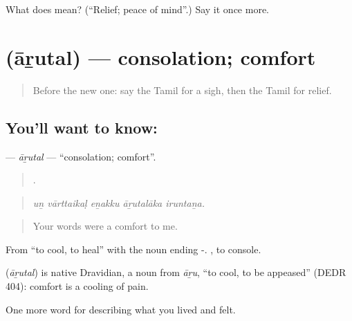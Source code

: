 \begin{tcolorbox}[breakable,colback=teal!4,colframe=teal!35!black,title={Before you move on}]
What does  mean? (\textquotedblleft{}Relief; peace of mind\textquotedblright{}.) Say it once more.
\end{tcolorbox}
\section[\texorpdfstring{\ta{ஆறுதல்} (āṟutal)}{ஆறுதல் (āṟutal)}]{ (āṟutal) — consolation; comfort}

\label{lesson:TA-C456-arutal}



\begin{quote}
Before the new one: say the Tamil for a sigh, then the Tamil for relief.
\end{quote}

\subsection*{You'll want to know: }
\textbf{} — \emph{āṟutal} — \textquotedblleft{}consolation; comfort\textquotedblright{}.

\begin{quote}
    .
\end{quote}

\begin{quote}
\emph{uṉ vārttaikaḷ eṉakku āṟutalāka iruntaṉa.}
\end{quote}

\begin{quote}
Your words were a comfort to me.
\end{quote}

From  \textquotedblleft{}to cool, to heal\textquotedblright{} with the noun ending -.  , to console.

\begin{cousinweb}
\textbf{} (\emph{āṟutal}) is native Dravidian, a noun from  \emph{āṟu}, \textquotedblleft{}to cool, to be appeased\textquotedblright{} (DEDR 404): comfort is a cooling of pain.
\end{cousinweb}

\begin{grammarlens}[title={What you've built}]
One more word for describing what you lived and felt.
\end{grammarlens}

